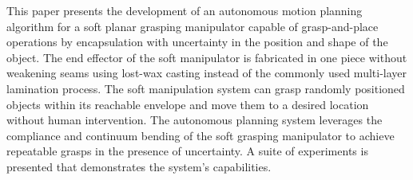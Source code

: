 This paper presents the development of an autonomous motion planning algorithm for a soft planar grasping manipulator capable of grasp-and-place operations by encapsulation
with uncertainty in the position and shape of the object.
The end effector of the soft manipulator is fabricated in one piece without weakening seams using lost-wax casting instead of the commonly used multi-layer lamination process.
The soft manipulation system can grasp randomly positioned objects within its reachable envelope and move them to a desired location without human intervention.
The autonomous planning system leverages the compliance and continuum bending of the soft grasping manipulator to achieve repeatable grasps in the presence of uncertainty.
A suite of experiments is presented that demonstrates the system's capabilities.